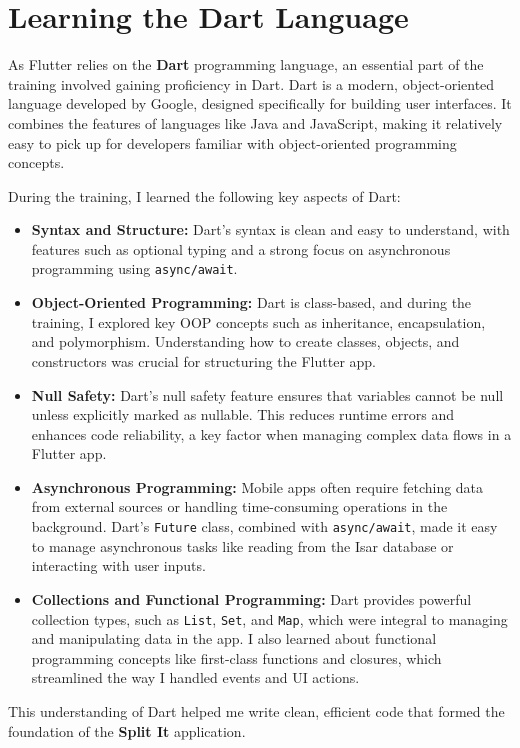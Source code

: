\documentclass[12pt,a4paper]{report}
\begin{document}
\section{Learning the Dart Language}

As Flutter relies on the \textbf{Dart} programming language, an essential part of the training involved gaining proficiency in Dart. Dart is a modern, object-oriented language developed by Google, designed specifically for building user interfaces. It combines the features of languages like Java and JavaScript, making it relatively easy to pick up for developers familiar with object-oriented programming concepts.

During the training, I learned the following key aspects of Dart:
\begin{itemize}
    \item \textbf{Syntax and Structure:} Dart’s syntax is clean and easy to understand, with features such as optional typing and a strong focus on asynchronous programming using \texttt{async/await}.
    \item \textbf{Object-Oriented Programming:} Dart is class-based, and during the training, I explored key OOP concepts such as inheritance, encapsulation, and polymorphism. Understanding how to create classes, objects, and constructors was crucial for structuring the Flutter app.
    \item \textbf{Null Safety:} Dart’s null safety feature ensures that variables cannot be null unless explicitly marked as nullable. This reduces runtime errors and enhances code reliability, a key factor when managing complex data flows in a Flutter app.
    \item \textbf{Asynchronous Programming:} Mobile apps often require fetching data from external sources or handling time-consuming operations in the background. Dart’s \texttt{Future} class, combined with \texttt{async/await}, made it easy to manage asynchronous tasks like reading from the Isar database or interacting with user inputs.
    \item \textbf{Collections and Functional Programming:} Dart provides powerful collection types, such as \texttt{List}, \texttt{Set}, and \texttt{Map}, which were integral to managing and manipulating data in the app. I also learned about functional programming concepts like first-class functions and closures, which streamlined the way I handled events and UI actions.
\end{itemize}

This understanding of Dart helped me write clean, efficient code that formed the foundation of the \textbf{Split It} application.
\end{document}
